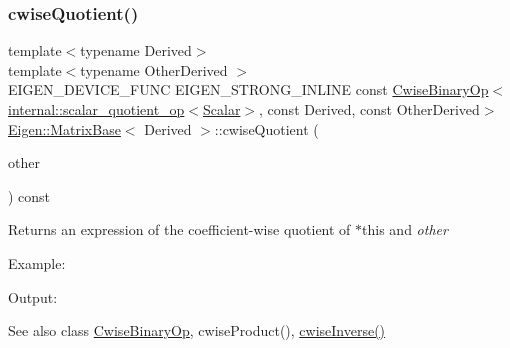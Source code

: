 \subsubsection{\texorpdfstring{cwiseQuotient()}{cwiseQuotient()}}
{\footnotesize\ttfamily template$<$typename Derived$>$ \\
template$<$typename Other\+Derived $>$ \\
E\+I\+G\+E\+N\+\_\+\+D\+E\+V\+I\+C\+E\+\_\+\+F\+U\+NC E\+I\+G\+E\+N\+\_\+\+S\+T\+R\+O\+N\+G\+\_\+\+I\+N\+L\+I\+NE const \mbox{\hyperlink{class_eigen_1_1_cwise_binary_op}{Cwise\+Binary\+Op}}$<$\mbox{\hyperlink{struct_eigen_1_1internal_1_1scalar__quotient__op}{internal\+::scalar\+\_\+quotient\+\_\+op}}$<$\mbox{\hyperlink{class_eigen_1_1_dense_base_a5feed465b3a8e60c47e73ecce83e39a2}{Scalar}}$>$, const Derived, const Other\+Derived$>$ \mbox{\hyperlink{class_eigen_1_1_matrix_base}{Eigen\+::\+Matrix\+Base}}$<$ Derived $>$\+::cwise\+Quotient (\begin{DoxyParamCaption}\item[{const E\+I\+G\+E\+N\+\_\+\+C\+U\+R\+R\+E\+N\+T\+\_\+\+S\+T\+O\+R\+A\+G\+E\+\_\+\+B\+A\+S\+E\+\_\+\+C\+L\+A\+SS$<$ Other\+Derived $>$ \&}]{other }\end{DoxyParamCaption}) const\hspace{0.3cm}{\ttfamily [inline]}}

\begin{DoxyReturn}{Returns}
an expression of the coefficient-\/wise quotient of $\ast$this and {\itshape other} 
\end{DoxyReturn}
Example\+: 
\begin{DoxyCodeInclude}{0}
\end{DoxyCodeInclude}
 Output\+: 
\begin{DoxyVerbInclude}
\end{DoxyVerbInclude}


\begin{DoxySeeAlso}{See also}
class \mbox{\hyperlink{class_eigen_1_1_cwise_binary_op}{Cwise\+Binary\+Op}}, cwise\+Product(), \mbox{\hyperlink{class_eigen_1_1_matrix_base_a96b087bbb06422f11b03a0e529064e31}{cwise\+Inverse()}} 
\end{DoxySeeAlso}
\mbox{\label{class_eigen_1_1_matrix_base_a200220dd2a2f97d4f3f68cd8a1c2b906}} 
